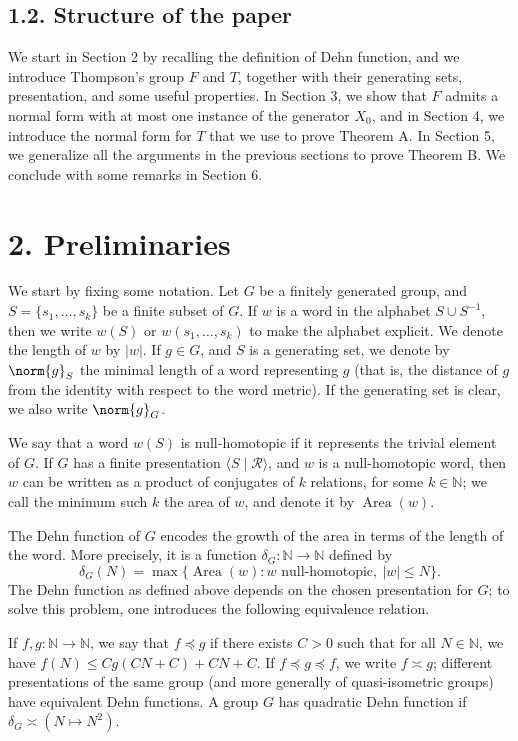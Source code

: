 \subsection*{1.2. Structure of the paper}
We start in Section 2 by recalling the definition of Dehn function, and we introduce Thompson's group $F$ and $T$, together with their generating sets, presentation, and some useful properties. In Section 3, we
\noindent show that $F$ admits a normal form with at most one instance of the generator $X_0$, and in Section 4, we introduce the normal form for $T$ that we use to prove Theorem A. In Section 5, we generalize all the arguments in the previous sections to prove Theorem B. We conclude with some remarks in Section 6.

\section*{2. Preliminaries}
We start by fixing some notation. Let $G$ be a finitely generated group, and $S=\{s_1,\ldots,s_k\}$ be a finite subset of $G$. If $w$ is a word in the alphabet $S\cup S^{-1}$, then we write $w(S)$ or $w(s_1,\ldots,s_k)$ to make the alphabet explicit. We denote the length of $w$ by $|w|$. If $g\in G$, and $S$ is a generating set, we denote by $\norm{g}_S$ the minimal length of a word representing $g$ (that is, the distance of $g$ from the identity with respect to the word metric). If the generating set is clear, we also write $\norm{g}_G$.

We say that a word $w(S)$ is null-homotopic if it represents the trivial element of $G$. If $G$ has a finite presentation $\langle S\mid\mathcal{R}\rangle$, and $w$ is a null-homotopic word, then $w$ can be written as a product of conjugates of $k$ relations, for some $k\in\mathbb{N}$; we call the minimum such $k$ the area of $w$, and denote it by $\operatorname{Area}(w)$.

The Dehn function of $G$ encodes the growth of the area in terms of the length of the word. More precisely, it is a function $\delta_G:\mathbb{N}\to\mathbb{N}$ defined by
\[
\delta_G(N)=\max\{\operatorname{Area}(w):w\text{ null-homotopic},\ |w|\le N\}.
\]
The Dehn function as defined above depends on the chosen presentation for $G$; to solve this problem, one introduces the following equivalence relation.

If $f,g:\mathbb{N}\to\mathbb{N}$, we say that $f\preccurlyeq g$ if there exists $C>0$ such that for all $N\in\mathbb{N}$, we have $f(N)\le Cg(CN+C)+CN+C$. If $f\preccurlyeq g\preccurlyeq f$, we write $f\asymp g$; different presentations of the same group (and more generally of quasi-isometric groups) have equivalent Dehn functions. A group $G$ has quadratic Dehn function if $\delta_G\asymp (N\mapsto N^2)$.

